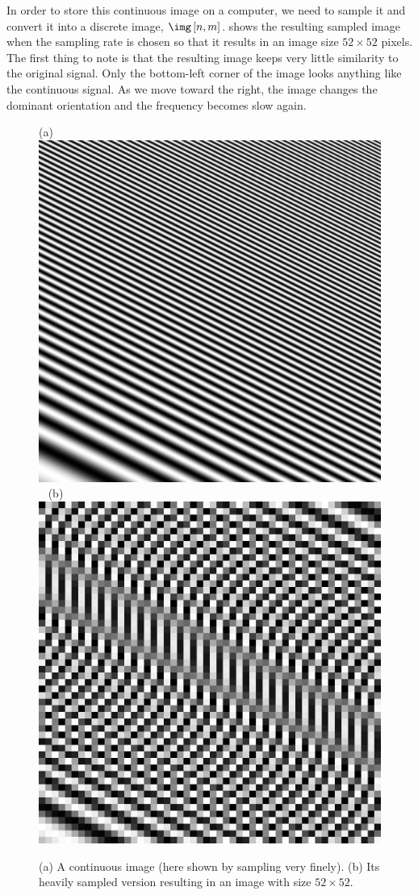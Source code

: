 In order to store this continuous image on a computer, we need to sample it and convert it into a discrete image, $\img \left[ n,m \right]$.  shows the resulting sampled image when the sampling rate is chosen so that it results in an image size $52 \times 52$ pixels. The first thing to note is that the resulting image keeps very little similarity to the original signal. Only the bottom-left corner of the image looks anything like the continuous signal. As we move toward the right, the image changes the dominant orientation and the frequency becomes slow again.


\begin{figure}[t]
    \centerline{
        (a)\includegraphics[width=0.45\linewidth]{figures/Image_processing_sampling/aliasing_1.jpg}
        ~
        (b)\includegraphics[width=0.45\linewidth]{figures/Image_processing_sampling/aliasing_2.jpg}
    }
    \caption{(a) A continuous image (here shown by sampling very finely). (b) Its heavily sampled version resulting in an image with size $52 \times 52$.}
    \label{fig:aliasing}
\end{figure}


